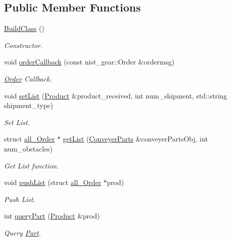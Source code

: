 \subsection*{Public Member Functions}
\begin{DoxyCompactItemize}
\item 
\hyperlink{classBuildClass_a03e935abdeb4b19d3e233dc6aa70f885}{Build\+Class} ()
\begin{DoxyCompactList}\small\item\em Constructor. \end{DoxyCompactList}\item 
void \hyperlink{classBuildClass_af3db7cdeb81f80f1b88f0cedb95d24e9}{order\+Callback} (const nist\+\_\+gear\+::\+Order \&ordermsg)
\begin{DoxyCompactList}\small\item\em \hyperlink{structOrder}{Order} Callback. \end{DoxyCompactList}\item 
void \hyperlink{classBuildClass_a7fa2d4355ca5ad8e2c26d82d5566d45e}{set\+List} (\hyperlink{structProduct}{Product} \&product\+\_\+received, int num\+\_\+shipment, std\+::string shipment\+\_\+type)
\begin{DoxyCompactList}\small\item\em Set List. \end{DoxyCompactList}\item 
struct \hyperlink{structall__Order}{all\+\_\+\+Order} $\ast$ \hyperlink{classBuildClass_afd4c97bb10d023ce4f6a6b15b88171a6}{get\+List} (\hyperlink{classConveyerParts}{Conveyer\+Parts} \&conveyer\+Parts\+Obj, int num\+\_\+obstacles)
\begin{DoxyCompactList}\small\item\em Get List function. \end{DoxyCompactList}\item 
void \hyperlink{classBuildClass_a64bc4cbe90399402e468f977e374f99e}{push\+List} (struct \hyperlink{structall__Order}{all\+\_\+\+Order} $\ast$prod)
\begin{DoxyCompactList}\small\item\em Push List. \end{DoxyCompactList}\item 
int \hyperlink{classBuildClass_acf20cc6dfbc979b0456b22a310627b42}{query\+Part} (\hyperlink{structProduct}{Product} \&prod)
\begin{DoxyCompactList}\small\item\em Query \hyperlink{structPart}{Part}. \end{DoxyCompactList}\item 

\end{DoxyCompactItemize}
